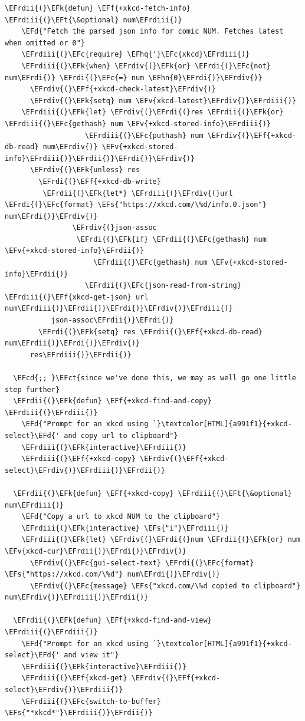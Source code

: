 \documentclass{scrartcl}
\newcommand{\EFk}[1]{\textcolor{EFk}{#1}} %
\newcommand{\EFd}[1]{\textcolor{EFd}{#1}} %
\newcommand{\EFt}[1]{\textcolor{EFt}{#1}} %
\newcommand{\EFs}[1]{\textcolor{EFs}{#1}} %
\newcommand{\EFct}[1]{\textcolor{EFct}{#1}} %
\newcommand{\EFc}[1]{\textcolor{EFc}{#1}} %
\newcommand{\EFv}[1]{\textcolor{EFv}{#1}} %
\newcommand{\EFf}[1]{\textcolor{EFf}{#1}} %
\newcommand{\EFcd}[1]{\textcolor{EFcd}{#1}} %
\newcommand{\EFhn}[1]{#1} %
\newcommand{\EFhq}[1]{#1} %
\newcommand{\EFrdi}[1]{#1} %
\newcommand{\EFrdii}[1]{#1} %
\newcommand{\EFrdiii}[1]{#1} %
\newcommand{\EFrdiv}[1]{#1} %
\begin{document}
\begin{Code}
\begin{Verbatim}[]
  \EFrdii{(}\EFk{defun} \EFf{+xkcd-fetch-info} \EFrdiii{(}\EFt{\&optional} num\EFrdiii{)}
    \EFd{"Fetch the parsed json info for comic NUM. Fetches latest when omitted or 0"}
    \EFrdiii{(}\EFc{require} \EFhq{'}\EFc{xkcd}\EFrdiii{)}
    \EFrdiii{(}\EFk{when} \EFrdiv{(}\EFk{or} \EFrdi{(}\EFc{not} num\EFrdi{)} \EFrdi{(}\EFc{=} num \EFhn{0}\EFrdi{)}\EFrdiv{)}
      \EFrdiv{(}\EFf{+xkcd-check-latest}\EFrdiv{)}
      \EFrdiv{(}\EFk{setq} num \EFv{xkcd-latest}\EFrdiv{)}\EFrdiii{)}
    \EFrdiii{(}\EFk{let} \EFrdiv{(}\EFrdi{(}res \EFrdii{(}\EFk{or} \EFrdiii{(}\EFc{gethash} num \EFv{+xkcd-stored-info}\EFrdiii{)}
                   \EFrdiii{(}\EFc{puthash} num \EFrdiv{(}\EFf{+xkcd-db-read} num\EFrdiv{)} \EFv{+xkcd-stored-info}\EFrdiii{)}\EFrdii{)}\EFrdi{)}\EFrdiv{)}
      \EFrdiv{(}\EFk{unless} res
        \EFrdi{(}\EFf{+xkcd-db-write}
         \EFrdii{(}\EFk{let*} \EFrdiii{(}\EFrdiv{(}url \EFrdi{(}\EFc{format} \EFs{"https://xkcd.com/\%d/info.0.json"} num\EFrdi{)}\EFrdiv{)}
                \EFrdiv{(}json-assoc
                 \EFrdi{(}\EFk{if} \EFrdii{(}\EFc{gethash} num \EFv{+xkcd-stored-info}\EFrdii{)}
                     \EFrdii{(}\EFc{gethash} num \EFv{+xkcd-stored-info}\EFrdii{)}
                   \EFrdii{(}\EFc{json-read-from-string} \EFrdiii{(}\EFf{xkcd-get-json} url num\EFrdiii{)}\EFrdii{)}\EFrdi{)}\EFrdiv{)}\EFrdiii{)}
           json-assoc\EFrdii{)}\EFrdi{)}
        \EFrdi{(}\EFk{setq} res \EFrdii{(}\EFf{+xkcd-db-read} num\EFrdii{)}\EFrdi{)}\EFrdiv{)}
      res\EFrdiii{)}\EFrdii{)}

  \EFcd{;; }\EFct{since we've done this, we may as well go one little step further}
  \EFrdii{(}\EFk{defun} \EFf{+xkcd-find-and-copy} \EFrdiii{(}\EFrdiii{)}
    \EFd{"Prompt for an xkcd using `}\textcolor[HTML]{a991f1}{+xkcd-select}\EFd{' and copy url to clipboard"}
    \EFrdiii{(}\EFk{interactive}\EFrdiii{)}
    \EFrdiii{(}\EFf{+xkcd-copy} \EFrdiv{(}\EFf{+xkcd-select}\EFrdiv{)}\EFrdiii{)}\EFrdii{)}

  \EFrdii{(}\EFk{defun} \EFf{+xkcd-copy} \EFrdiii{(}\EFt{\&optional} num\EFrdiii{)}
    \EFd{"Copy a url to xkcd NUM to the clipboard"}
    \EFrdiii{(}\EFk{interactive} \EFs{"i"}\EFrdiii{)}
    \EFrdiii{(}\EFk{let} \EFrdiv{(}\EFrdi{(}num \EFrdii{(}\EFk{or} num \EFv{xkcd-cur}\EFrdii{)}\EFrdi{)}\EFrdiv{)}
      \EFrdiv{(}\EFc{gui-select-text} \EFrdi{(}\EFc{format} \EFs{"https://xkcd.com/\%d"} num\EFrdi{)}\EFrdiv{)}
      \EFrdiv{(}\EFc{message} \EFs{"xkcd.com/\%d copied to clipboard"} num\EFrdiv{)}\EFrdiii{)}\EFrdii{)}

  \EFrdii{(}\EFk{defun} \EFf{+xkcd-find-and-view} \EFrdiii{(}\EFrdiii{)}
    \EFd{"Prompt for an xkcd using `}\textcolor[HTML]{a991f1}{+xkcd-select}\EFd{' and view it"}
    \EFrdiii{(}\EFk{interactive}\EFrdiii{)}
    \EFrdiii{(}\EFf{xkcd-get} \EFrdiv{(}\EFf{+xkcd-select}\EFrdiv{)}\EFrdiii{)}
    \EFrdiii{(}\EFc{switch-to-buffer} \EFs{"*xkcd*"}\EFrdiii{)}\EFrdii{)}


\end{Verbatim}
\end{Code}
\end{document}
